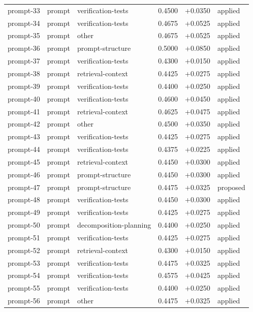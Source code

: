 \begin{center}
\begin{longtable}{llp{5.2cm}rrl}
prompt-33 & prompt & verification-tests & 0.4500 & +0.0350 & applied \\
prompt-34 & prompt & verification-tests & 0.4675 & +0.0525 & applied \\
prompt-35 & prompt & other & 0.4675 & +0.0525 & applied \\
prompt-36 & prompt & prompt-structure & 0.5000 & +0.0850 & applied \\
prompt-37 & prompt & verification-tests & 0.4300 & +0.0150 & applied \\
prompt-38 & prompt & retrieval-context & 0.4425 & +0.0275 & applied \\
prompt-39 & prompt & verification-tests & 0.4400 & +0.0250 & applied \\
prompt-40 & prompt & verification-tests & 0.4600 & +0.0450 & applied \\
prompt-41 & prompt & retrieval-context & 0.4625 & +0.0475 & applied \\
prompt-42 & prompt & other & 0.4500 & +0.0350 & applied \\
prompt-43 & prompt & verification-tests & 0.4425 & +0.0275 & applied \\
prompt-44 & prompt & verification-tests & 0.4375 & +0.0225 & applied \\
prompt-45 & prompt & retrieval-context & 0.4450 & +0.0300 & applied \\
prompt-46 & prompt & prompt-structure & 0.4450 & +0.0300 & applied \\
prompt-47 & prompt & prompt-structure & 0.4475 & +0.0325 & proposed \\
prompt-48 & prompt & verification-tests & 0.4450 & +0.0300 & applied \\
prompt-49 & prompt & verification-tests & 0.4425 & +0.0275 & applied \\
prompt-50 & prompt & decomposition-planning & 0.4400 & +0.0250 & applied \\
prompt-51 & prompt & verification-tests & 0.4425 & +0.0275 & applied \\
prompt-52 & prompt & retrieval-context & 0.4300 & +0.0150 & applied \\
prompt-53 & prompt & verification-tests & 0.4475 & +0.0325 & applied \\
prompt-54 & prompt & verification-tests & 0.4575 & +0.0425 & applied \\
prompt-55 & prompt & verification-tests & 0.4400 & +0.0250 & applied \\
prompt-56 & prompt & other & 0.4475 & +0.0325 & applied \\

\end{longtable}
\end{center}

